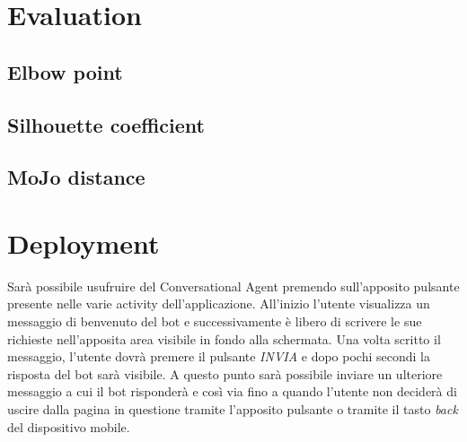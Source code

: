 \documentclass[a4paper, 10pt]{report}
\begin{document}
    \chapter{Evaluation}\label{ch:evaluation}


        \section{Elbow point}\label{sec:elbow-point}


        \section{Silhouette coefficient}\label{sec:silhouette-coefficient}


        \section{MoJo distance}\label{sec:mojo-distance}


    \chapter{Deployment}\label{ch:deployment}

    Sarà possibile usufruire del Conversational Agent premendo sull'apposito pulsante presente nelle varie activity dell'applicazione.
    All'inizio l'utente visualizza un messaggio di benvenuto del bot e successivamente è libero di scrivere le sue
    richieste nell'apposita area visibile in fondo alla schermata. Una volta scritto il messaggio, l'utente dovrà premere il pulsante
    \textit{INVIA} e dopo pochi secondi la risposta del bot sarà visibile. A questo punto sarà possibile inviare un ulteriore messaggio a cui
    il bot risponderà e così via fino a quando l'utente non deciderà di uscire dalla pagina in questione tramite l'apposito pulsante
    o tramite il tasto \textit{back} del dispositivo mobile.
\end{document}
